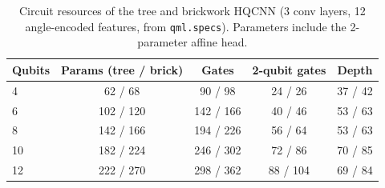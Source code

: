 \begin{table}[t]
\centering
\caption{Circuit resources of the tree and brickwork HQCNN (3 conv layers, 12 angle-encoded features, from \texttt{qml.specs}). Parameters include the 2-parameter affine head.}
\label{tab:v3_specs}
\small
\begin{tabular}{lcccc}
\toprule
Qubits & Params (tree / brick) & Gates & 2-qubit gates & Depth \\
\midrule
4 & 62 / 68 & 90 / 98 & 24 / 26 & 37 / 42 \\
6 & 102 / 120 & 142 / 166 & 40 / 46 & 53 / 63 \\
8 & 142 / 166 & 194 / 226 & 56 / 64 & 53 / 63 \\
10 & 182 / 224 & 246 / 302 & 72 / 86 & 70 / 85 \\
12 & 222 / 270 & 298 / 362 & 88 / 104 & 69 / 84 \\
\bottomrule
\end{tabular}
\end{table}
